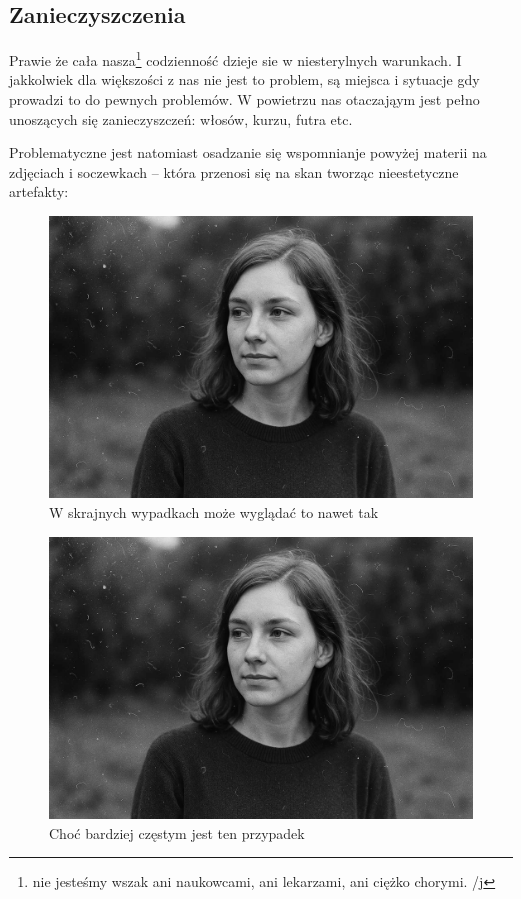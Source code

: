 \documentclass[]{mwart}
\begin{document}
\subsection{Zanieczyszczenia}
Prawie że cała nasza\footnote{nie jesteśmy wszak ani naukowcami, ani lekarzami, ani ciężko chorymi. /j} codzienność
dzieje sie w niesterylnych warunkach. I jakkolwiek dla większości z nas nie jest to problem, są miejsca i sytuacje
gdy prowadzi to do pewnych problemów. W powietrzu nas otaczająym jest pełno unoszących się zanieczyszczeń: włosów, kurzu, futra etc.

Problematyczne jest natomiast osadzanie się wspomnianje powyżej materii na zdjęciach i soczewkach -- która przenosi się na
skan tworząc nieestetyczne artefakty:

\begin{figure}[H]
    \centering
    \includegraphics[width=\linewidth, keepaspectratio]{p_1.jpg}
    \caption{W skrajnych wypadkach może wyglądać to nawet tak}
\end{figure}

\begin{figure}[H]
    \centering
    \includegraphics[width=\linewidth, keepaspectratio]{p_1.jpg}
    \caption{Choć bardziej częstym jest ten przypadek}
\end{figure}
\end{document}
